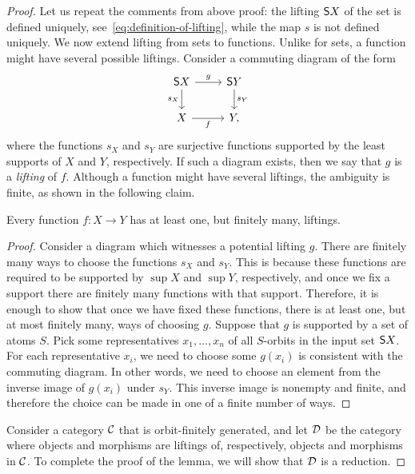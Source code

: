 \begin{proof}
    Let us repeat the comments from above proof: the lifting $\mathsf{S} X$ of the set is defined uniquely, see~\eqref{eq:definition-of-lifting}, while the  map $s$ is not defined uniquely.
    We now extend lifting from sets to functions. Unlike for sets, a function might have several possible liftings.  Consider a commuting diagram of the form 
    \[
    \begin{tikzcd}
    \subpol X \arrow[r,"g"] \arrow[d,"s_X"'] & \subpol Y \arrow[d,"s_Y"] \\
    X \arrow[r,"f"'] & Y,
    \end{tikzcd}
    \]
    where the functions $s_X$ and $s_Y$ are surjective functions supported by the least supports of $X$ and $Y$, respectively. If such a diagram exists, then we say that $g$ is a \emph{lifting} of $f$. Although a function might have several liftings, the ambiguity is finite, as shown in the following claim.

\begin{claim}\label{claim:liftings-finite}
    Every function $f : X \to Y$ has at least one, but finitely many,  liftings. 
\end{claim}
\begin{proof}
    Consider a diagram which witnesses a potential lifting $g$. There are finitely many ways to choose the functions $s_X$ and $s_Y$. This is because these functions are required to be supported by $\sup X$ and $\sup Y$, respectively, and once we fix a support there are finitely many functions with that support.  Therefore, it is enough to show that once we have fixed these functions, there is at least one, but at most  finitely many, ways of choosing  $g$. Suppose that $g$ is supported by a set of atoms $S$. Pick some representatives $x_1,\ldots,x_n$ of all $S$-orbits in the input set $\mathsf{S} X$.  For each representative $x_i$, we need to choose some $g(x_i)$ is consistent with the commuting diagram. In other words, we need to choose an element from the inverse image of $g(x_i)$ under $s_Y$. This inverse image is nonempty and finite, and therefore the choice can be made in one of a finite number of ways. 
\end{proof}

Consider a category ${\mathcal C}$ that is orbit-finitely generated, and let ${\mathcal D}$ be the category where objects and morphisms are liftings of, respectively,  objects and morphisms in ${\mathcal C}$. To complete the proof of the lemma, we will show that ${\mathcal D}$ is a reduction. 


\end{proof}
